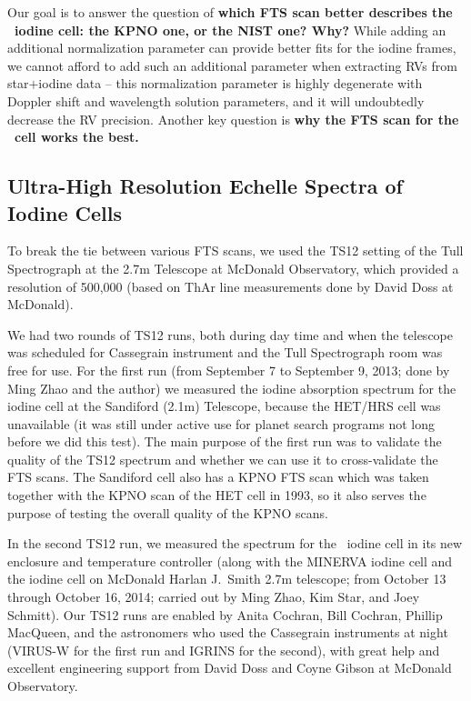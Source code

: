Our goal is to answer the question of {\bf which FTS scan better describes
the \het\ iodine cell: the KPNO one, or the NIST one? Why?} While adding an
additional normalization parameter can provide better fits for the
iodine frames, we cannot afford to add such an additional parameter
when extracting RVs from star$+$iodine data -- this normalization
parameter is highly degenerate with Doppler shift and wavelength
solution parameters, and it will undoubtedly decrease the RV
precision. Another key question is {\bf why the FTS scan for the \keck\
cell works the best.}


\subsection{Ultra-High Resolution Echelle Spectra of Iodine Cells}

To break the tie between various FTS scans, we used the TS12 setting
of the Tull Spectrograph at the 2.7m Telescope at McDonald
Observatory, which provided a resolution of 500,000 (based on ThAr
line measurements done by David Doss at McDonald). 

We had two rounds of TS12 runs, both during day time and when the
telescope was scheduled for Cassegrain instrument and the Tull
Spectrograph room was free for use. For the first run (from September
7 to September 9, 2013; done by Ming Zhao and the author) we measured
the iodine absorption spectrum for the iodine cell at the Sandiford
(2.1m) Telescope, because the HET/HRS cell was unavailable (it was
still under active use for planet search programs not long before we
did this test). The main purpose of the first run was to validate the
quality of the TS12 spectrum and whether we can use it to
cross-validate the FTS scans. The Sandiford cell also has a KPNO FTS
scan which was taken together with the KPNO scan of the HET cell in
1993, so it also serves the purpose of testing the overall quality of
the KPNO scans.

In the second TS12 run, we measured the spectrum for the \het\ iodine
cell in its new enclosure and temperature controller (along with the
MINERVA iodine cell and the iodine cell on McDonald Harlan J.\ Smith
2.7m telescope; from October 13 through October 16, 2014; carried out
by Ming Zhao, Kim Star, and Joey Schmitt). Our TS12 runs are enabled
by Anita Cochran, Bill Cochran, Phillip MacQueen, and the astronomers
who used the Cassegrain instruments at night (VIRUS-W for the first
run and IGRINS for the second), with great help and excellent
engineering support from David Doss and Coyne Gibson at McDonald
Observatory.

